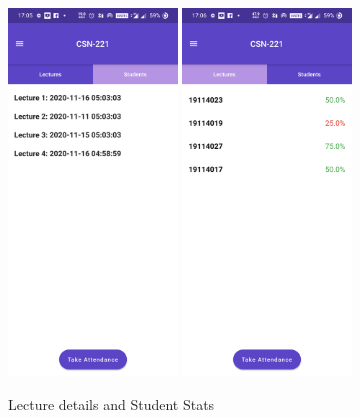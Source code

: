 \documentclass{article}
\begin{document}
\begin{figure}[H]
    \centering
    \includegraphics[width=0.40\textwidth]{Students.jpg}
    \includegraphics[width=0.40\textwidth]{Lectures.jpg}
    \caption{Lecture details and Student Stats}
    \label{fig:LecSt}
\end{figure}
\end{document}
